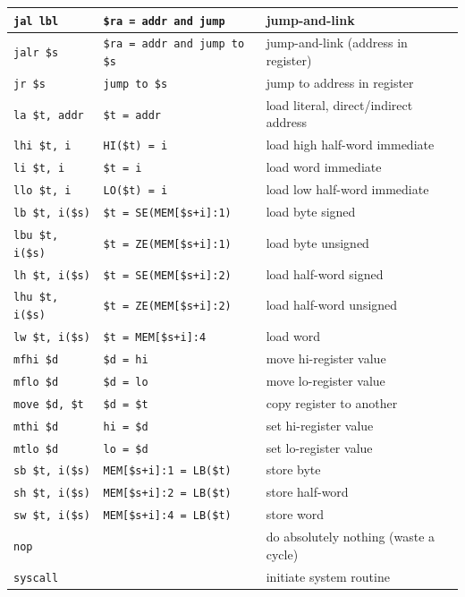 \documentclass[12pt]{article}
\begin{document}
\begin{longtable}{l || l | l}
    \texttt{jal   lbl} & \texttt{\$ra = addr and jump} & jump-and-link\\ \hline
    \texttt{jalr  \$s} & \texttt{\$ra = addr and jump to \$s} & jump-and-link (address in register)\\ \hline
    \texttt{jr    \$s} & \texttt{jump to \$s} & jump to address in register\\
    \hhline{=#=|=}
    \texttt{la    \$t, addr} & \texttt{\$t = addr} & load literal, direct/indirect address\\ \hline
    \texttt{lhi   \$t, i} & \texttt{HI(\$t) = i} & load high half-word immediate\\ \hline
    \texttt{li    \$t, i} & \texttt{\$t = i} & load word immediate\\ \hline
    \texttt{llo   \$t, i} & \texttt{LO(\$t) = i} & load low half-word immediate\\ \hline
    \texttt{lb    \$t, i(\$s)} & \texttt{\$t = SE(MEM[\$s+i]:1)} & load byte signed\\ \hline
    \texttt{lbu   \$t, i(\$s)} & \texttt{\$t = ZE(MEM[\$s+i]:1)} & load byte unsigned\\ \hline
    \texttt{lh    \$t, i(\$s)} & \texttt{\$t = SE(MEM[\$s+i]:2)} & load half-word signed\\ \hline
    \texttt{lhu   \$t, i(\$s)} & \texttt{\$t = ZE(MEM[\$s+i]:2)} & load half-word unsigned\\ \hline
    \texttt{lw    \$t, i(\$s)} & \texttt{\$t = MEM[\$s+i]:4} & load word\\ \hline
    \texttt{mfhi  \$d} & \texttt{\$d = hi} & move hi-register value\\ \hline
    \texttt{mflo  \$d} & \texttt{\$d = lo} & move lo-register value\\ \hline
    \texttt{move  \$d, \$t} & \texttt{\$d = \$t} & copy register to another\\ \hline
    \texttt{mthi  \$d} & \texttt{hi = \$d} & set hi-register value\\ \hline
    \texttt{mtlo  \$d} & \texttt{lo = \$d} & set lo-register value\\ \hline
    \texttt{sb    \$t, i(\$s)} & \texttt{MEM[\$s+i]:1 = LB(\$t)} & store byte\\ \hline
    \texttt{sh    \$t, i(\$s)} & \texttt{MEM[\$s+i]:2 = LB(\$t)} & store half-word\\ \hline
    \texttt{sw    \$t, i(\$s)} & \texttt{MEM[\$s+i]:4 = LB(\$t)} & store word\\
    \hhline{=#=|=}
    \texttt{nop} & & do absolutely nothing (waste a cycle)\\ \hline
    \texttt{syscall} & & initiate system routine
\end{longtable}
\end{document}
